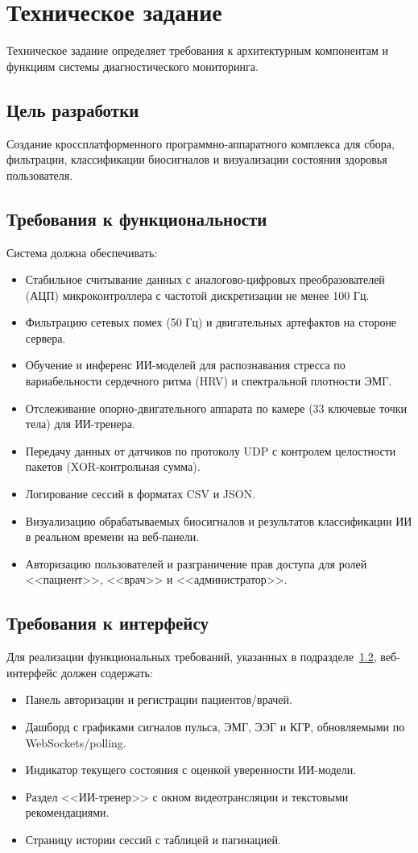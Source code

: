 \documentclass[utf8, russian]{eskdtext}
\begin{document}
\section{Техническое задание}
Техническое задание определяет требования к архитектурным компонентам и функциям системы диагностического мониторинга.

\subsection{Цель разработки}
Создание кроссплатформенного программно-аппаратного комплекса для сбора, фильтрации, классификации биосигналов и визуализации состояния здоровья пользователя.

\subsection{Требования к функциональности}\label{subsec:func_req}
Система должна обеспечивать:
\begin{itemize}
    \item Стабильное считывание данных с аналогово-цифровых преобразователей (АЦП) микроконтроллера с частотой дискретизации не менее 100 Гц.
    \item Фильтрацию сетевых помех (50 Гц) и двигательных артефактов на стороне сервера.
    \item Обучение и инференс ИИ-моделей для распознавания стресса по вариабельности сердечного ритма (HRV) и спектральной плотности ЭМГ.
    \item Отслеживание опорно-двигательного аппарата по камере (33 ключевые точки тела) для ИИ-тренера.
    \item Передачу данных от датчиков по протоколу UDP с контролем целостности пакетов (XOR-контрольная сумма).
    \item Логирование сессий в форматах CSV и JSON.
    \item Визуализацию обрабатываемых биосигналов и результатов классификации ИИ в реальном времени на веб-панели.
    \item Авторизацию пользователей и разграничение прав доступа для ролей <<пациент>>, <<врач>> и <<администратор>>.
\end{itemize}

\subsection{Требования к интерфейсу}
Для реализации функциональных требований, указанных в подразделе~\ref{subsec:func_req}, веб-интерфейс должен содержать:
\begin{itemize}
    \item Панель авторизации и регистрации пациентов/врачей.
    \item Дашборд с графиками сигналов пульса, ЭМГ, ЭЭГ и КГР, обновляемыми по WebSockets/polling.
    \item Индикатор текущего состояния с оценкой уверенности ИИ-модели.
    \item Раздел <<ИИ-тренер>> с окном видеотрансляции и текстовыми рекомендациями.
    \item Страницу истории сессий с таблицей и пагинацией.
\end{itemize}
\end{document}
